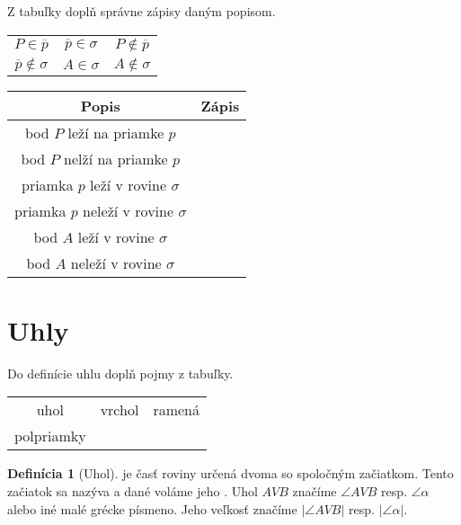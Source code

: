 \documentclass[12pt, twopage]{article}
\theoremstyle{definition}
\newtheorem{definition}{Definícia}
\newcommand{\blank}
{\underline{\hspace{4cm}}}
\begin{document}
	Z tabuľky doplň správne zápisy daným popisom.
	
	\begin{center}
		\begin{tabular}{|ccc|}
			\hline
			$P \in \overline{p}$ & $\overline{p} \in \sigma$ & $P \notin \overline{p}$ \\
			$\overline{p} \notin \sigma$ & $A \in \sigma$ & $A \notin \sigma$\\
			\hline
		\end{tabular}
	\end{center}
	
	\begin{center}
		\begin{tabular}{|c|c|}
			\hline 
			Popis & Zápis \\
			\hline
			bod $P$ leží na priamke $p$ & \hspace{3cm} \\
			\hline
			bod $P$ nelží na priamke $p$ & \\
			\hline
			priamka $p$ leží v rovine $\sigma$ & \\
			\hline
			priamka $p$ neleží v rovine $\sigma$ & \\
			\hline
			bod $A$ leží v rovine $\sigma$ & \\
			\hline
			bod $A$ neleží v rovine $\sigma$ & \\
			\hline
			
		\end{tabular}
	\end{center}
	
	\newpage
	\section{Uhly}
	
	Do definície uhlu doplň pojmy z tabuľky.
	
	\begin{center}
		\begin{tabular}{|ccc|}
			\hline
			uhol & vrchol & ramená \\
			polpriamky & & \\
			\hline
		\end{tabular}
	\end{center}
	
	\begin{definition}[Uhol]
		\blank je časť roviny určená dvoma \blank so spoločným začiatkom.
		Tento začiatok sa nazýva \blank a dané \blank voláme jeho \blank. Uhol $AVB$ značíme $\angle AVB$ resp. $\angle \alpha$ alebo iné malé grécke písmeno. Jeho veľkosť značíme $|\angle AVB|$ resp. $|\angle \alpha|$.
	\end{definition}
	
\end{document}
